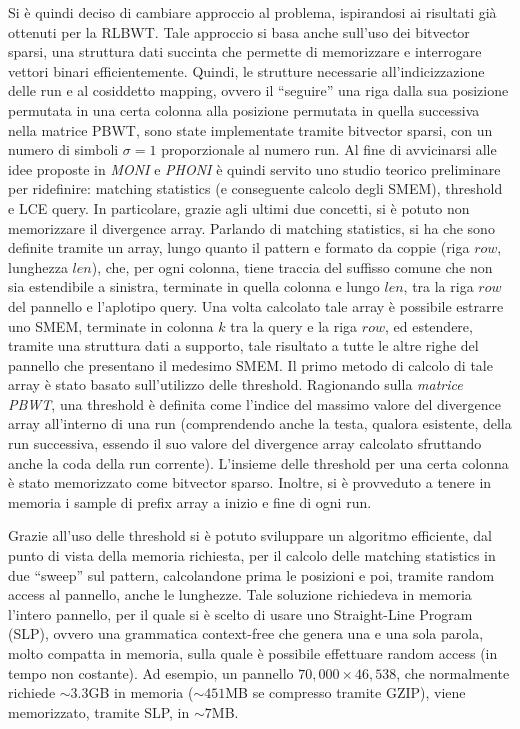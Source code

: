 \documentclass[a4paper,11pt, oneside,italian]{article}
\begin{document}
Si è quindi deciso di cambiare approccio al problema, ispirandosi ai risultati
già ottenuti per la RLBWT. Tale approccio si basa anche sull'uso dei bitvector
sparsi, una struttura dati succinta che permette di memorizzare e interrogare
vettori binari efficientemente.
Quindi, le strutture necessarie all'indicizzazione delle run e al cosiddetto
mapping, ovvero il ``seguire'' una riga dalla sua posizione permutata in una
certa colonna alla posizione permutata in quella successiva nella matrice PBWT,
sono state implementate tramite bitvector sparsi, con un numero di simboli
$\sigma=1$ proporzionale al numero run.
Al fine di avvicinarsi alle idee proposte in \textit{MONI} e \textit{PHONI} è
quindi servito uno studio teorico preliminare per ridefinire: matching
statistics (e conseguente calcolo degli SMEM), threshold e LCE query. In
particolare, grazie agli  
ultimi due concetti, si è potuto non memorizzare il divergence array.
Parlando di matching statistics, si ha che sono definite tramite un array, lungo
quanto il pattern e formato da coppie (riga $row$, lunghezza $len$), che, per
ogni colonna, tiene traccia del suffisso comune che non sia estendibile a
sinistra, terminate in quella colonna e lungo $len$, tra la riga $row$ del
pannello e l'aplotipo query. Una volta calcolato tale
array è possibile estrarre uno SMEM, terminate in colonna $k$ tra la query e la
riga $row$, ed estendere, tramite una struttura dati a supporto, tale risultato
a tutte le altre righe del pannello che presentano il medesimo SMEM.
Il primo metodo di calcolo di tale array è stato basato sull'utilizzo delle
threshold. Ragionando sulla \textit{matrice PBWT}, una threshold è definita
come l'indice del massimo valore del divergence array all'interno di una run
(comprendendo anche la testa, qualora esistente, della run successiva, essendo
il suo valore del divergence array calcolato sfruttando anche la coda della run
corrente). L'insieme delle threshold per una certa colonna è stato memorizzato
come bitvector sparso. Inoltre, si è provveduto a tenere in memoria i
sample di prefix array a inizio e fine di ogni run.

Grazie all'uso delle threshold si è potuto sviluppare un algoritmo
efficiente, dal punto di vista della memoria richiesta, per il calcolo delle
matching statistics in due ``sweep'' sul pattern, calcolandone prima le
posizioni e poi, tramite random access al pannello, anche le
lunghezze. Tale soluzione richiedeva in memoria l'intero pannello, per il quale
si è scelto di usare uno Straight-Line Program (SLP), ovvero una grammatica
context-free che genera una e una sola parola, molto compatta in memoria, sulla
quale è possibile effettuare random access (in tempo non costante). Ad esempio,
un pannello $70,000 \times 46,538$, che normalmente richiede $\sim 3.3$GB in
memoria ($\sim 451$MB se compresso tramite GZIP), viene memorizzato, tramite
SLP, in $\sim 7$MB.
\end{document}
